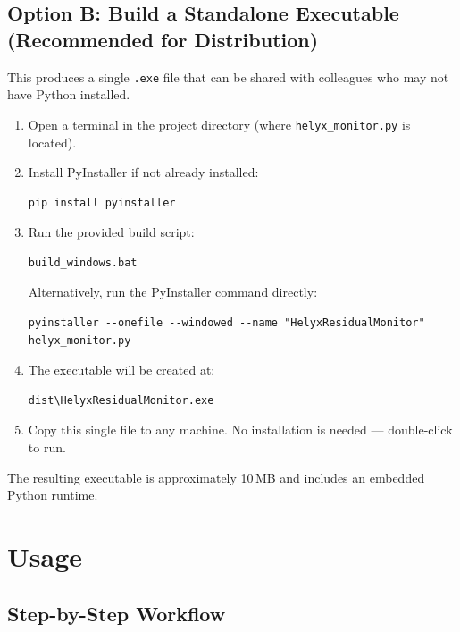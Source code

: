 \documentclass[12pt]{article}
\begin{document}
\subsection{Option B: Build a Standalone Executable (Recommended for Distribution)}

This produces a single \texttt{.exe} file that can be shared with colleagues who may not have Python installed.

\begin{enumerate}[nosep]
    \item Open a terminal in the project directory (where \texttt{helyx\_monitor.py} is located).
    \item Install PyInstaller if not already installed:
\begin{lstlisting}
pip install pyinstaller
\end{lstlisting}
    \item Run the provided build script:
\begin{lstlisting}
build_windows.bat
\end{lstlisting}
    Alternatively, run the PyInstaller command directly:
\begin{lstlisting}
pyinstaller --onefile --windowed --name "HelyxResidualMonitor" helyx_monitor.py
\end{lstlisting}
    \item The executable will be created at:
\begin{lstlisting}
dist\HelyxResidualMonitor.exe
\end{lstlisting}
    \item Copy this single file to any machine. No installation is needed --- double-click to run.
\end{enumerate}

\noindent The resulting executable is approximately 10\,MB and includes an embedded Python runtime.

\section{Usage}

\subsection{Step-by-Step Workflow}
\end{document}
